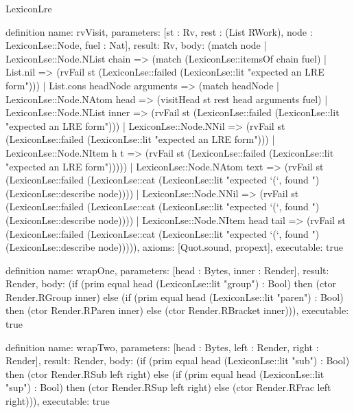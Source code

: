 \begin{lexlean}{LexiconLre}
\begin{semanticmodule}
definition{
  name: rvVisit,
  parameters: [st : Rv, rest : (List RWork), node : LexiconLse::Node, fuel : Nat],
  result: Rv,
  body: (match node
    | LexiconLse::Node.NList chain => (match (LexiconLse::itemsOf chain fuel)
      | List.nil => (rvFail st (LexiconLse::failed (LexiconLse::lit "expected an LRE form")))
      | List.cons headNode arguments => (match headNode
        | LexiconLse::Node.NAtom head => (visitHead st rest head arguments fuel)
        | LexiconLse::Node.NList inner => (rvFail st (LexiconLse::failed (LexiconLse::lit "expected an LRE form")))
        | LexiconLse::Node.NNil => (rvFail st (LexiconLse::failed (LexiconLse::lit "expected an LRE form")))
        | LexiconLse::Node.NItem h t => (rvFail st (LexiconLse::failed (LexiconLse::lit "expected an LRE form")))))
    | LexiconLse::Node.NAtom text => (rvFail st (LexiconLse::failed (LexiconLse::cat (LexiconLse::lit "expected `(`, found ") (LexiconLse::describe node))))
    | LexiconLse::Node.NNil => (rvFail st (LexiconLse::failed (LexiconLse::cat (LexiconLse::lit "expected `(`, found ") (LexiconLse::describe node))))
    | LexiconLse::Node.NItem head tail => (rvFail st (LexiconLse::failed (LexiconLse::cat (LexiconLse::lit "expected `(`, found ") (LexiconLse::describe node))))),
  axioms: [Quot.sound, propext],
  executable: true
}

definition{
  name: wrapOne,
  parameters: [head : Bytes, inner : Render],
  result: Render,
  body: (if (prim equal head (LexiconLse::lit "group") : Bool) then (ctor Render.RGroup inner) else (if (prim equal head (LexiconLse::lit "paren") : Bool) then (ctor Render.RParen inner) else (ctor Render.RBracket inner))),
  executable: true
}

definition{
  name: wrapTwo,
  parameters: [head : Bytes, left : Render, right : Render],
  result: Render,
  body: (if (prim equal head (LexiconLse::lit "sub") : Bool) then (ctor Render.RSub left right) else (if (prim equal head (LexiconLse::lit "sup") : Bool) then (ctor Render.RSup left right) else (ctor Render.RFrac left right))),
  executable: true
}


\end{semanticmodule}
\end{lexlean}
